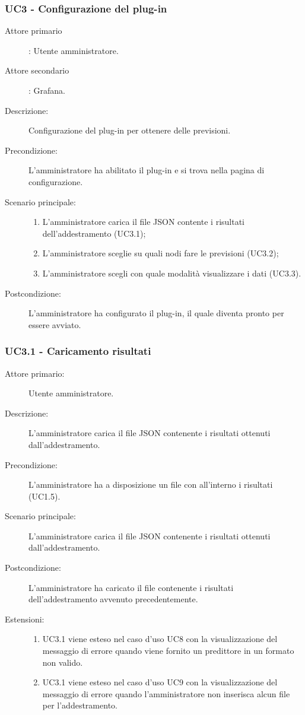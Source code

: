 \subsubsection{UC3 - Configurazione del plug-in}
\label{sssec:uc3}
\begin{description}
  \item[Attore primario]: Utente amministratore.
  \item[Attore secondario]: Grafana.
  \item[Descrizione:] Configurazione del plug-in per ottenere delle previsioni.
  \item[Precondizione:] L'amministratore ha abilitato il plug-in e si trova nella pagina di configurazione.
  \item[Scenario principale:]
  \begin{enumerate}
    \item L'amministratore carica il file JSON contente i risultati dell'addestramento (UC3.1);
    \item L'amministratore sceglie su quali nodi fare le previsioni (UC3.2);
    \item L'amministratore scegli con quale modalità visualizzare i dati (UC3.3).
  \end{enumerate}
  \item[Postcondizione:] L'amministratore ha configurato il plug-in, il quale diventa pronto per essere avviato.
\end{description}

\subsubsection{UC3.1 - Caricamento risultati}
\label{sssec:uc3.1}
\begin{description}
  \item[Attore primario:] Utente amministratore.
  \item[Descrizione:] L'amministratore carica il file JSON contenente i risultati ottenuti dall'addestramento.
  \item[Precondizione:] L'amministratore ha a disposizione un file con all'interno i risultati (UC1.5).
  \item[Scenario principale:] L'amministratore carica il file JSON contenente i risultati ottenuti dall'addestramento.
  \item[Postcondizione:] L'amministratore ha caricato il file contenente i risultati dell'addestramento avvenuto precedentemente.
  \item[Estensioni:]
  \begin{enumerate}	
	\item UC3.1 viene esteso nel caso d'uso UC8 con la visualizzazione del messaggio di errore quando viene fornito un predittore in un formato non valido.
	\item UC3.1 viene esteso nel caso d'uso UC9 con la visualizzazione del messaggio di errore quando l'amministratore non inserisca alcun file per l'addestramento.
  \end{enumerate}
\end{description}

